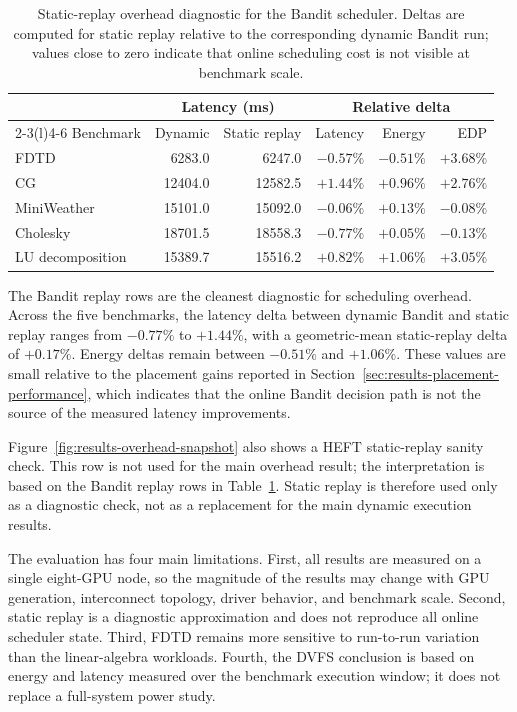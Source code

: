 \begin{table}[!htbp]
\centering
\begingroup
\scriptsize
\setlength{\tabcolsep}{3pt}
\begin{tabular}{@{}lrrrrr@{}}
\toprule
& \multicolumn{2}{c}{Latency (ms)}
& \multicolumn{3}{c}{Relative delta} \\
\cmidrule(lr){2-3}\cmidrule(l){4-6}
Benchmark & Dynamic & Static replay & Latency & Energy & EDP \\
\midrule
FDTD & 6283.0 & 6247.0 & \(-0.57\%\) & \(-0.51\%\) & \(+3.68\%\) \\
CG & 12404.0 & 12582.5 & \(+1.44\%\) & \(+0.96\%\) & \(+2.76\%\) \\
MiniWeather & 15101.0 & 15092.0 & \(-0.06\%\) & \(+0.13\%\) & \(-0.08\%\) \\
Cholesky & 18701.5 & 18558.3 & \(-0.77\%\) & \(+0.05\%\) & \(-0.13\%\) \\
LU decomposition & 15389.7 & 15516.2 & \(+0.82\%\) & \(+1.06\%\) & \(+3.05\%\) \\
\bottomrule
\end{tabular}%
\endgroup
\caption{Static-replay overhead diagnostic for the Bandit scheduler. Deltas are computed for static replay relative to the corresponding dynamic Bandit run; values close to zero indicate that online scheduling cost is not visible at benchmark scale.}
\label{tab:results-overhead}
\end{table}

\figOverheadSnapshot

The Bandit replay rows are the cleanest diagnostic for scheduling overhead.
Across the five benchmarks, the latency delta between dynamic Bandit and
static replay ranges from \(-0.77\%\) to \(+1.44\%\), with a geometric-mean
static-replay delta of \(+0.17\%\). Energy deltas remain between
\(-0.51\%\) and \(+1.06\%\). These values are small relative to the
placement gains reported in Section~\ref{sec:results-placement-performance},
which indicates that the online Bandit decision path is not the source of the
measured latency improvements.

Figure~\ref{fig:results-overhead-snapshot} also shows a HEFT static-replay
sanity check. This row is not used for the main overhead result; the
interpretation is based on the Bandit replay rows in Table~\ref{tab:results-overhead}.
Static replay is therefore used only as a diagnostic check, not as a
replacement for the main dynamic execution results.

The evaluation has four main limitations. First, all results are measured on a
single eight-GPU node, so the magnitude of the results may change with GPU
generation, interconnect topology, driver behavior, and benchmark scale.
Second, static replay is a diagnostic approximation and does not reproduce all
online scheduler state. Third, FDTD remains more sensitive to run-to-run
variation than the linear-algebra workloads. Fourth, the DVFS conclusion is
based on energy and latency measured over the benchmark execution window; it
does not replace a full-system power study.

